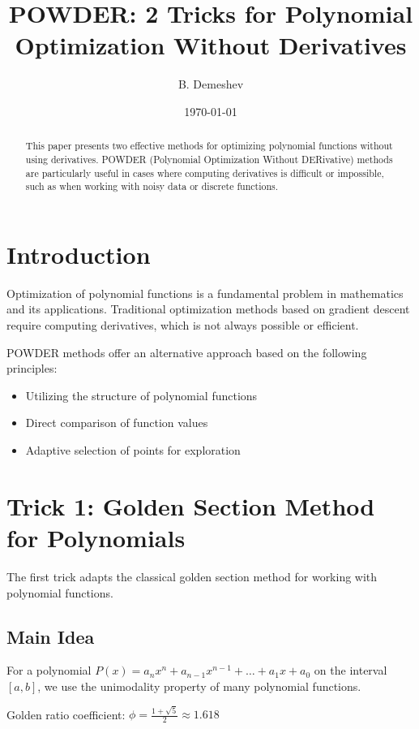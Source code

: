 \documentclass[12pt,a4paper]{article}
\title{POWDER: 2 Tricks for Polynomial Optimization Without Derivatives}
\author{B. Demeshev}
\date{\today}
\begin{document}
\maketitle

\begin{abstract}
This paper presents two effective methods for optimizing polynomial functions without using derivatives. POWDER (Polynomial Optimization Without DERivative) methods are particularly useful in cases where computing derivatives is difficult or impossible, such as when working with noisy data or discrete functions.
\end{abstract}

\section{Introduction}

Optimization of polynomial functions is a fundamental problem in mathematics and its applications. Traditional optimization methods based on gradient descent require computing derivatives, which is not always possible or efficient.

POWDER methods offer an alternative approach based on the following principles:
\begin{itemize}
    \item Utilizing the structure of polynomial functions
    \item Direct comparison of function values
    \item Adaptive selection of points for exploration
\end{itemize}

\section{Trick 1: Golden Section Method for Polynomials}

The first trick adapts the classical golden section method for working with polynomial functions.

\subsection{Main Idea}

For a polynomial $P(x) = a_n x^n + a_{n-1} x^{n-1} + \ldots + a_1 x + a_0$ on the interval $[a, b]$, we use the unimodality property of many polynomial functions.

Golden ratio coefficient: $\phi = \frac{1 + \sqrt{5}}{2} \approx 1.618$
\end{document}
